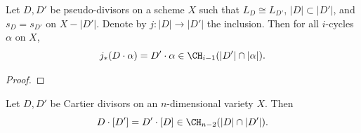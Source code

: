   \begin{proposition}
    Let $D,D'$ be pseudo-divisors on a scheme $X$ such that $L_D \cong L_{D'}$, $|D| \subset |D'|$, and $s_D = s_{D'}$ on $X - |D'|$.
    Denote by $j: |D| \to |D'|$ the inclusion.
    Then for all $i$-cycles $\alpha$ on $X$, 
    \[ j_*(D \cdot \alpha) = D' \cdot \alpha \in \CH_{i-1}(|D'| \cap |\alpha|). \]
  \end{proposition}
  \begin{proof}
    \Yang{}
  \end{proof}

  \begin{theorem}\label{thm:commutativity_of_intersection_with_cartier_divisors}
    Let $D,D'$ be Cartier divisors on an $n$-dimensional variety $X$.
    Then 
    \[  D \cdot [D'] = D' \cdot [D] \in \CH_{n-2}(|D| \cap |D'|). \]
  \end{theorem}
